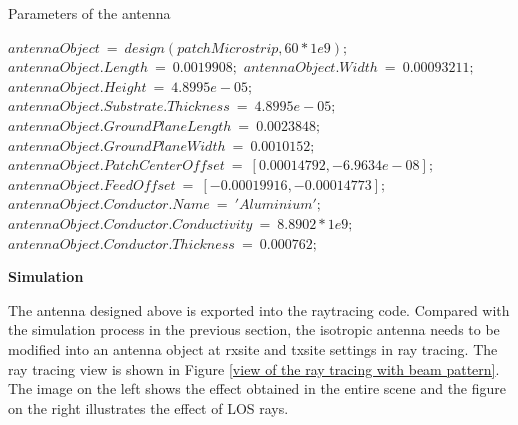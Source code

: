 \documentclass[12pt,DIV14,BCOR12mm,a4paper,footinclude=false,headinclude,parskip=half-,twoside,openright,cleardoublepage=empty,toc=index,bibliography=totoc,listof=totoc]{scrreprt}
\numberwithin{equation}{chapter}
\begin{document}
\begin{algorithm}
    \caption{Parameters of the antenna}
    \label{parameters of the final antenna}
    \begin{algorithmic}
        \STATE $antennaObject\ =\ design(patchMicrostrip, 60*1e9);$
        \STATE $antennaObject.Length\ =\ 0.0019908;$
        \STATE $antennaObject.Width\ =\ 0.00093211;$
        \STATE $antennaObject.Height\ =\ 4.8995e-05;$
        \STATE $antennaObject.Substrate.Thickness\ =\ 4.8995e-05;$
        \STATE $antennaObject.GroundPlaneLength\ =\ 0.0023848;$
        \STATE $antennaObject.GroundPlaneWidth\ =\ 0.0010152;$
        \STATE $antennaObject.PatchCenterOffset\ =\ [0.00014792, -6.9634e-08];$
        \STATE $antennaObject.FeedOffset\ =\ [-0.00019916, -0.00014773];$
        \STATE $antennaObject.Conductor.Name\ =\ 'Aluminium';$
        \STATE $antennaObject.Conductor.Conductivity\ =\ 8.8902*1e9;$
        \STATE $antennaObject.Conductor.Thickness\ =\ 0.000762; $
    \end{algorithmic}
\end{algorithm}

\begin{spacing}{1.5}
\textbf{\large{Simulation}}
\end{spacing}

The antenna designed above is exported into the raytracing code. Compared with the simulation process in the previous section, the isotropic antenna needs to be modified into an antenna object at rxsite and txsite settings in ray tracing. The ray tracing view is shown in Figure \ref{view of the ray tracing with beam pattern}. The image on the left shows the effect obtained in the entire scene and the figure on the right illustrates the effect of LOS rays.
\end{document}
